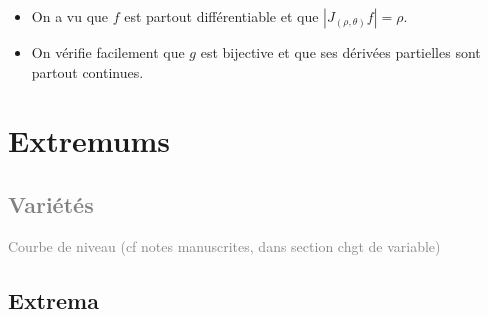 \proof
\begin{itemize}
  \item On a vu que $f$ est partout différentiable et que $|J_{(\rho, \theta)}f| = \rho$.
  \item On vérifie facilement que $g$ est bijective et que ses dérivées partielles sont partout continues.
\end{itemize}
\eproof


\section{Extremums}

\subsection{\textcolor{gray}{Variétés}}

\textcolor{gray}{Courbe de niveau (cf notes manuscrites, dans section chgt de variable)}

\subsection{Extrema}

